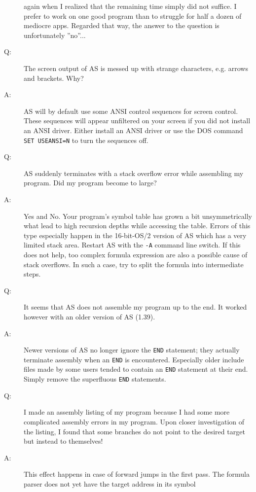 \documentclass[12pt,twoside]{report}
\newcommand{\tty}[1]{{\tt #1}}
\begin{document}
\begin{description}
{   again when I realized that the remaining time simply did not
   suffice.  I prefer to work on one good program than to struggle for
   half a dozen of mediocre apps.  Regarded that way, the answer to
   the question is unfortunately ''no''...}
\vspace{0.3cm}
\item[Q:]{The screen output of AS is messed up with strange characters, e.g.
   arrows and brackets.  Why?}
\item[A:]{AS will by default use some ANSI control sequences for screen
   control.  These sequences will appear unfiltered on your screen
   if you did not install an ANSI driver.  Either install an ANSI
   driver or use the DOS command \tty{SET USEANSI=N} to turn the
   sequences off.}
\vspace{0.3cm}
\item[Q:]{AS suddenly terminates with a stack overflow error while
   assembling my program.  Did my program become to large?}
\item[A:]{Yes and No.  Your program's symbol table has grown a bit
   unsymmetrically what lead to high recursion depths while accessing
   the table.  Errors of this type especially happen in the
   16-bit-OS/2 version of AS which has a very limited stack area.
   Restart AS with the \tty{-A} command line switch.  If this does not
   help, too complex formula expression are also a possible cause of
   stack overflows.  In such a case, try to split the formula into
   intermediate steps.}
\vspace{0.3cm}
\item[Q:]{It seems that AS does not assemble my program up to the end.  It
   worked however with an older version of AS (1.39).}
\item[A:]{Newer versions of AS no longer ignore the \tty{END} statement; they
   actually terminate assembly when an \tty{END} is encountered.
   Especially older include files made by some users tended to
   contain an \tty{END} statement at their end.  Simply remove the
   superfluous \tty{END} statements.}
\vspace{0.3cm}
\item[Q:]{I made an assembly listing of my program because I had some more
   complicated assembly errors in my program.  Upon closer
   investigation of the listing, I found that some branches do not
   point to the desired target but instead to themselves!}
\item[A:]{This effect happens in case of forward jumps in the first pass.
   The formula parser does not yet have the target address in its symbol
}
\end{description}
\end{document}
